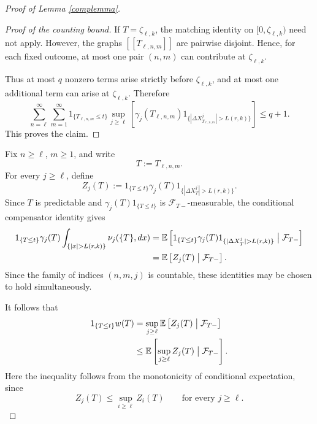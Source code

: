 \documentclass[a4paper,10pt]{article}
\newcommand{\E}{\mathbb E}
\begin{document}
\begin{proof}[Proof of Lemma \ref{complemma}]
\begin{proof}[Proof of the counting bound]
If \(T=\zeta_{\ell,k}\), the matching identity on
\([0,\zeta_{\ell,k})\) need not apply. However, the graphs
\([[T_{\ell,n,m}]]\) are pairwise disjoint. Hence, for each fixed
outcome, at most one pair \((n,m)\) can contribute at
\(\zeta_{\ell,k}\).

Thus at most \(q\) nonzero terms arise strictly before
\(\zeta_{\ell,k}\), and at most one additional term can arise at
\(\zeta_{\ell,k}\). Therefore
\[
\sum_{n=\ell}^{\infty}
\sum_{m=1}^{\infty}
1_{\{T_{\ell,n,m}\le t\}}
\sup_{j\ge\ell}
\left[
\gamma_j(T_{\ell,n,m})
1_{\{|\Delta X^j_{T_{\ell,n,m}}|>L(r,k)\}}
\right]
\le q+1.
\]
This proves the claim.
\end{proof}

Fix \(n\ge\ell\), \(m\ge1\), and write
\[
        T:=T_{\ell,n,m}.
\]
For every \(j\ge\ell\), define
\[
Z_j(T)
:=
1_{\{T\le t\}}
\gamma_j(T)
1_{\{|\Delta X^j_T|>L(r,k)\}}.
\]
Since \(T\) is predictable and
\(\gamma_j(T)1_{\{T\le t\}}\) is
\(\mathcal F_{T-}\)-measurable, the conditional compensator identity
gives
\[
\begin{aligned}
1_{\{T\le t\}}
\gamma_j(T)
\int_{\{|x|>L(r,k)\}}
\nu_j(\{T\},dx)
&=
\E\left[
1_{\{T\le t\}}
\gamma_j(T)
1_{\{|\Delta X^j_T|>L(r,k)\}}
\bigm|
\mathcal F_{T-}
\right]
\\
&=
\E\left[
Z_j(T)
\bigm|
\mathcal F_{T-}
\right].
\end{aligned}
\]
Since the family of indices \((n,m,j)\) is countable, these identities
may be chosen to hold simultaneously.

It follows that
\[
\begin{aligned}
1_{\{T\le t\}}w(T)
&=
\sup_{j\ge\ell}
\E\left[
Z_j(T)
\bigm|
\mathcal F_{T-}
\right]
\\
&\le
\E\left[
\sup_{j\ge\ell}Z_j(T)
\bigm|
\mathcal F_{T-}
\right].
\end{aligned}
\]
Here the inequality follows from the monotonicity of conditional
expectation, since
\[
        Z_j(T)\le\sup_{i\ge\ell}Z_i(T)
        \qquad\text{for every }j\ge\ell.
\]


\end{proof}
\end{document}
